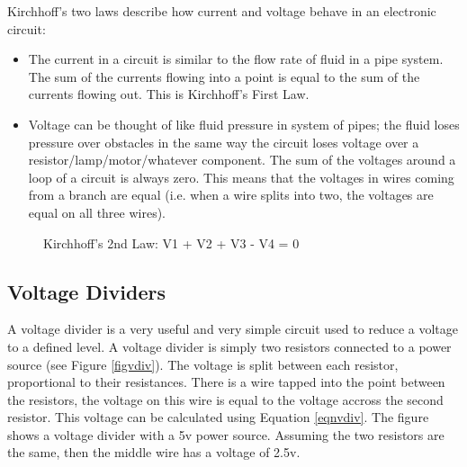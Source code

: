 \documentclass[a4]{report}
\begin{document}
	Kirchhoff's two laws describe how current and voltage behave in an electronic circuit:
	\begin{itemize}
	\item The current in a circuit is similar to the flow rate of fluid in a pipe system. The sum of the currents flowing into a point is equal to the sum of the currents flowing out. This is Kirchhoff's First Law. 
	\item Voltage can be thought of like fluid pressure in system of pipes; the fluid loses pressure over obstacles in the same way the circuit loses voltage over a resistor/lamp/motor/whatever component. The sum of the voltages around a loop of a circuit is always zero. This means that the voltages in wires coming from a branch are equal (i.e. when a wire splits into two, the voltages are equal on all three wires).
	\end{itemize}
	\begin{figure}[!htb]
		\centering
		\caption{Kirchhoff's 2nd Law: V1 + V2 + V3 - V4 = 0}
		\label{figk2law}
	\end{figure}
	
	\subsection{Voltage Dividers}
	
	A voltage divider is a very useful and very simple circuit used to reduce a voltage to a defined level. A voltage divider is simply two resistors connected to a power source (see Figure \ref{figvdiv}). The voltage is split between each resistor, proportional to their resistances. There is a wire tapped into the point between the resistors, the voltage on this wire is equal to the voltage accross the second resistor. This voltage can be calculated using Equation \ref{eqnvdiv}. The figure shows a voltage divider with a 5v power source. Assuming the two resistors are the same, then the middle wire has a voltage of 2.5v.
	
\end{document}
